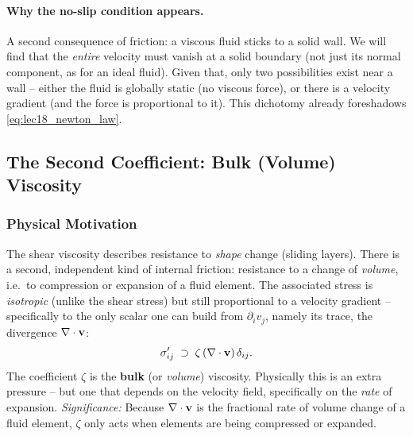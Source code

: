 \documentclass[../main.tex]{subfiles}
\begin{document}

\paragraph{Why the no-slip condition appears.} A second consequence of friction: a viscous fluid sticks to a solid wall. We will find that the \emph{entire} velocity must vanish at a solid boundary (not just its normal component, as for an ideal fluid). Given that, only two possibilities exist near a wall -- either the fluid is globally static (no viscous force), or there is a velocity gradient (and the force is proportional to it). This dichotomy already foreshadows \eqref{eq:lec18_newton_law}.

\subsection{The Second Coefficient: Bulk (Volume) Viscosity}\label{sec:lec18:bulk}

\subsubsection*{Physical Motivation}
The shear viscosity describes resistance to \emph{shape} change (sliding layers). There is a second, independent kind of internal friction: resistance to a change of \emph{volume}, i.e.\ to compression or expansion of a fluid element. The associated stress is \emph{isotropic} (unlike the shear stress) but still proportional to a velocity gradient -- specifically to the only scalar one can build from $\partial_i v_j$, namely its trace, the divergence $\nabla \cdot\mathbf{v}$:
\begin{equation}
  \sigma'_{ij} \;\supset\; \zeta\,(\nabla \cdot\mathbf{v})\,\delta_{ij}.
  \label{eq:lec18_bulk_stress}
\end{equation}
The coefficient $\zeta$ is the \textbf{bulk} (or \emph{volume}) viscosity. Physically this is an extra pressure -- but one that depends on the velocity field, specifically on the \emph{rate} of expansion.
\textit{Significance:} Because $\nabla \cdot\mathbf{v}$ is the fractional rate of volume change of a fluid element, $\zeta$ only acts when elements are being compressed or expanded.
\end{document}
